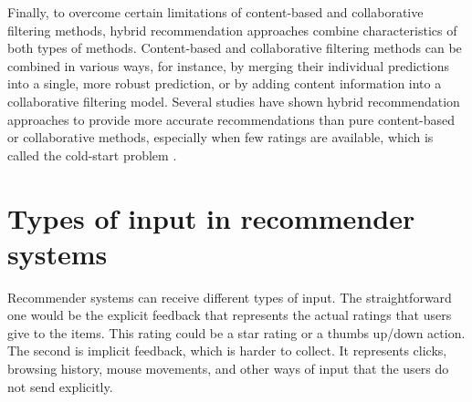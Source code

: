 Finally, to overcome certain limitations of content-based and collaborative filtering methods, hybrid recommendation approaches combine characteristics of both types of methods. Content-based and collaborative filtering methods can be combined in various ways, for instance, by merging their individual predictions into a single, more robust prediction, or by adding content information into a collaborative filtering model. Several studies have shown hybrid recommendation approaches to provide more accurate recommendations than pure content-based or collaborative methods, especially when few ratings are available, which is called the cold-start problem \cite{desrosiers2011comprehensive}.

\section{Types of input in recommender systems}

Recommender systems can receive different types of input. The straightforward one would be the explicit feedback that represents the actual ratings that users give to the items. This rating could be a star rating or a thumbs up/down action. The second is implicit feedback, which is harder to collect. It represents clicks, browsing history, mouse movements, and other ways of input that the users do not send explicitly.

